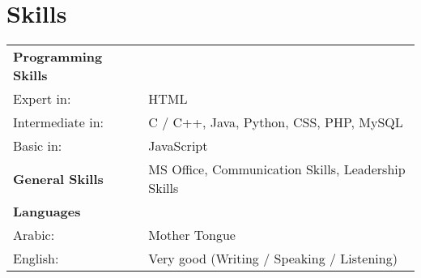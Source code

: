 \documentclass[a4paper,12pt]{article}
\begin{document}
\section{Skills}
\begin{tabularx}{\linewidth}{@{}l X@{}}
\textbf{Programming Skills} & \\
Expert in: & \normalsize{HTML} \\
Intermediate in: & \normalsize{C / C++, Java, Python, CSS, PHP, MySQL} \\
Basic in: & \normalsize{JavaScript} \\[3.75pt]

\textbf{General Skills} & \normalsize{MS Office, Communication Skills, Leadership Skills} \\[3.75pt]

\textbf{Languages} & \\
Arabic: & \normalsize{Mother Tongue} \\
English: & \normalsize{Very good (Writing / Speaking / Listening)} \\
\end{tabularx}

\vfill
{}
\end{document}
